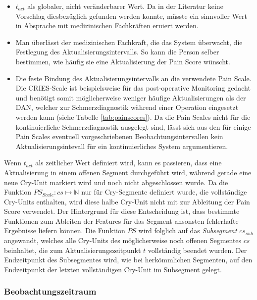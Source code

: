  \begin{itemize}
 \item $t_{act}$ als globaler, nicht veränderbarer Wert. Da in der Literatur keine Vorschlag diesbezüglich gefunden werden konnte, müsste ein sinnvoller Wert in Absprache mit medizinischen Fachkräften eruiert werden. 
 \item Man überlässt der medizinischen Fachkraft, die das System überwacht, die Festlegung des Aktualisierungsintervalls. So kann die Person selber bestimmen, wie häufig sie eine Aktualisierung der Pain Score wünscht.
 \item Die feste Bindung des Aktualisierungsintervalls an die verwendete Pain Scale. Die CRIES-Scale ist beispielsweise für das post-operative Monitoring gedacht und benötigt somit möglicherweise weniger häufige Aktualisierungen als der DAN, welcher zur Schmerzdiagnostik während einer Operation eingesetzt werden kann (siehe Tabelle \ref{tab:painscores}). Da die Pain Scales nicht für die kontinuierliche Schmerzdiagnostik ausgelegt sind, lässt sich aus den für einige Pain Scales eventuell vorgeschriebenen Beobachtungsintervallen kein Aktualisierungsintevall für ein kontinuierliches System argumentieren.
 \end{itemize}
 
 Wenn $t_{act}$ als zeitlicher Wert definiert wird, kann es passieren, dass eine Aktualisierung in einem offenen Segment durchgeführt wird, während gerade eine neue Cry-Unit markiert wird und noch nicht abgeschlossen wurde. Da die Funktion $PS_{Scale}: cs \mapsto \mathbb{N}$ nur für Cry-Segmente definiert wurde, die vollständige Cry-Units enthalten, wird diese \glqq halbe Cry-Unit\grqq{} nicht mit zur Ableitung der Pain Score verwendet. Der Hintergrund für diese Entscheidung ist, dass bestimmte Funktionen zum Ableiten der Features für das Segment ansonsten fehlerhafte Ergebnisse liefern können. Die Funktion $PS$ wird folglich auf das \emph{Subsegment} $cs_{sub}$ angewandt, welches alle Cry-Units des möglicherweise noch offenen Segmentes $cs$ beinhaltet, die zum Aktualisierungszeitpunkt $t$ vollständig beendet wurden. Der Endzeitpunkt des Subsegmentes wird, wie bei herkömmlichen Segmenten, auf den Endzeitpunkt der letzten vollständigen Cry-Unit im Subsegment gelegt.
  
 \subsubsection{Beobachtungszeitraum}

